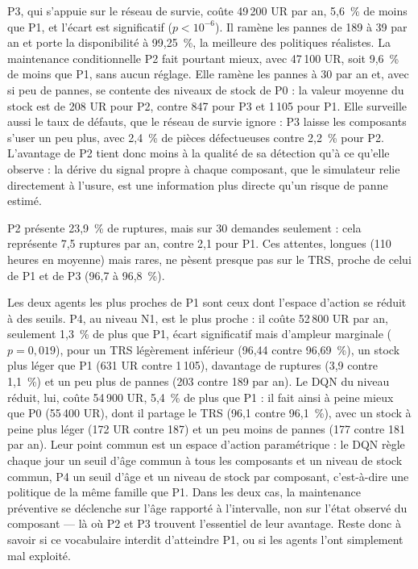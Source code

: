 P3, qui s'appuie sur le réseau de survie, coûte 49\,200 UR par an, 5,6~\% de moins que P1, et l'écart est significatif ($p < 10^{-6}$). Il ramène les pannes de 189 à 39 par an et porte la disponibilité à 99,25~\%, la meilleure des politiques réalistes. La maintenance conditionnelle P2 fait pourtant mieux, avec 47\,100 UR, soit 9,6~\% de moins que P1, sans aucun réglage. Elle ramène les pannes à 30 par an et, avec si peu de pannes, se contente des niveaux de stock de P0 : la valeur moyenne du stock est de 208 UR pour P2, contre 847 pour P3 et 1\,105 pour P1. Elle surveille aussi le taux de défauts, que le réseau de survie ignore : P3 laisse les composants s'user un peu plus, avec 2,4~\% de pièces défectueuses contre 2,2~\% pour P2. L'avantage de P2 tient donc moins à la qualité de sa détection qu'à ce qu'elle observe : la dérive du signal propre à chaque composant, que le simulateur relie directement à l'usure, est une information plus directe qu'un risque de panne estimé.

P2 présente 23,9~\% de ruptures, mais sur 30 demandes seulement : cela représente 7,5 ruptures par an, contre 2,1 pour P1. Ces attentes, longues (110 heures en moyenne) mais rares, ne pèsent presque pas sur le TRS, proche de celui de P1 et de P3 (96,7 à 96,8~\%).

Les deux agents les plus proches de P1 sont ceux dont l'espace d'action se réduit à des seuils. P4, au niveau N1, est le plus proche : il coûte 52\,800 UR par an, seulement 1,3~\% de plus que P1, écart significatif mais d'ampleur marginale ($p = 0{,}019$), pour un TRS légèrement inférieur (96,44 contre 96,69~\%), un stock plus léger que P1 (631 UR contre 1\,105), davantage de ruptures (3,9 contre 1,1~\%) et un peu plus de pannes (203 contre 189 par an). Le DQN du niveau réduit, lui, coûte 54\,900 UR, 5,4~\% de plus que P1 : il fait ainsi à peine mieux que P0 (55\,400 UR), dont il partage le TRS (96,1 contre 96,1~\%), avec un stock à peine plus léger (172 UR contre 187) et un peu moins de pannes (177 contre 181 par an). Leur point commun est un espace d'action paramétrique : le DQN règle chaque jour un seuil d'âge commun à tous les composants et un niveau de stock commun, P4 un seuil d'âge et un niveau de stock par composant, c'est-à-dire une politique de la même famille que P1. Dans les deux cas, la maintenance préventive se déclenche sur l'âge rapporté à l'intervalle, non sur l'état observé du composant — là où P2 et P3 trouvent l'essentiel de leur avantage. Reste donc à savoir si ce vocabulaire interdit d'atteindre P1, ou si les agents l'ont simplement mal exploité.

